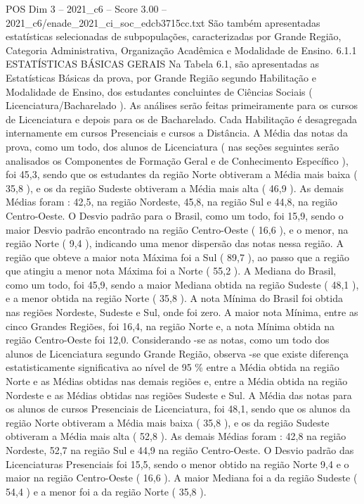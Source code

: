 \begin{textsample}{POS Dim 3 – 2021\_c6 – Score 3.00 – 2021\_c6/enade\_2021\_ci\_soc\_edcb3715cc.txt}
São também apresentadas estatísticas selecionadas de subpopulações, caracterizadas por Grande Região, Categoria Administrativa, Organização Acadêmica e Modalidade de Ensino. 6.1.1 ESTATÍSTICAS BÁSICAS GERAIS Na Tabela 6.1, são apresentadas as Estatísticas Básicas da prova, por Grande Região segundo Habilitação e Modalidade de Ensino, dos estudantes concluintes de Ciências Sociais ( Licenciatura/Bacharelado ).
As análises serão feitas primeiramente para os cursos de Licenciatura e depois para os de Bacharelado.
Cada Habilitação é desagregada internamente em cursos Presenciais e cursos a Distância.
A Média das notas da prova, como um todo, dos alunos de Licenciatura ( nas seções seguintes serão analisados os Componentes de Formação Geral e de Conhecimento Específico ), foi 45,3, sendo que os estudantes da região Norte obtiveram a Média mais baixa ( 35,8 ), e os da região Sudeste obtiveram a Média mais alta ( 46,9 ).
As demais Médias foram : 42,5, na região Nordeste, 45,8, na região Sul e 44,8, na região Centro-Oeste.
O Desvio padrão para o Brasil, como um todo, foi 15,9, sendo o maior Desvio padrão encontrado na região Centro-Oeste ( 16,6 ), e o menor, na região Norte ( 9,4 ), indicando uma menor dispersão das notas nessa região.
A região que obteve a maior nota Máxima foi a Sul ( 89,7 ), ao passo que a região que atingiu a menor nota Máxima foi a Norte ( 55,2 ).
A Mediana do Brasil, como um todo, foi 45,9, sendo a maior Mediana obtida na região Sudeste ( 48,1 ), e a menor obtida na região Norte ( 35,8 ).
A nota Mínima do Brasil foi obtida nas regiões Nordeste, Sudeste e Sul, onde foi zero.
A maior nota Mínima, entre as cinco Grandes Regiões, foi 16,4, na região Norte e, a nota Mínima obtida na região Centro-Oeste foi 12,0.
Considerando -se as notas, como um todo dos alunos de Licenciatura segundo Grande Região, observa -se que existe diferença estatisticamente significativa ao nível de 95 \% entre a Média obtida na região Norte e as Médias obtidas nas demais regiões e, entre a Média obtida na região Nordeste e as Médias obtidas nas regiões Sudeste e Sul.
A Média das notas para os alunos de cursos Presenciais de Licenciatura, foi 48,1, sendo que os alunos da região Norte obtiveram a Média mais baixa ( 35,8 ), e os da região Sudeste obtiveram a Média mais alta ( 52,8 ).
As demais Médias foram : 42,8 na região Nordeste, 52,7 na região Sul e 44,9 na região Centro-Oeste.
O Desvio padrão das Licenciaturas Presenciais foi 15,5, sendo o menor obtido na região Norte 9,4 e o maior na região Centro-Oeste ( 16,6 ).
A maior Mediana foi a da região Sudeste ( 54,4 ) e a menor foi a da região Norte ( 35,8 ).

\end{textsample}
